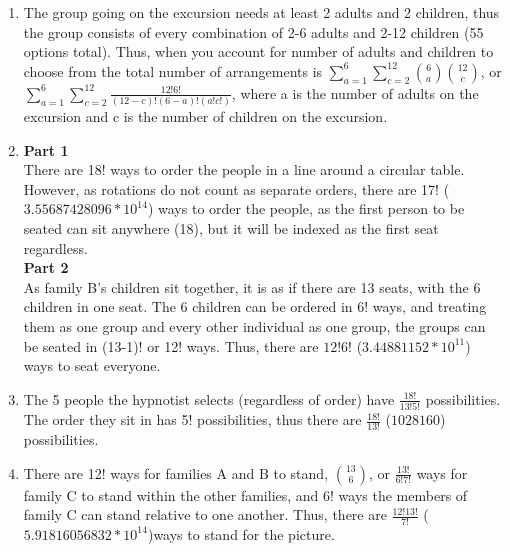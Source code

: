 \documentclass{article}
\theoremstyle{definition}
\begin{document}
\begin{enumerate}[label = \alph*)]
    \item
    The group going on the excursion needs at least 2 adults and 2 children, thus the group consists of every combination of 2-6 adults and 2-12 children (55 options total). Thus, when you account for number of adults and children to choose from the total number of arrangements is $\sum_{a=1}^6\sum_{c=2}^12\binom{6}{a}\binom{12}{c}$, or $\sum_{a=1}^6\sum_{c=2}^12 \frac{12!6!}{(12-c)!(6-a)!(a!c!)}$, where a is the number of adults on the excursion and c is the number of children on the excursion.
    
    \item
    \textbf{Part 1}\\
    There are 18! ways to order the people in a line around a circular table. However, as rotations do not count as separate orders, there are 17! ($3.55687428096*10^14$) ways to order the people, as the first person to be seated can sit anywhere (18), but it will be indexed as the first seat regardless.\\
    \textbf{Part 2}\\
    As family B's children sit together, it is as if there are 13 seats, with the 6 children in one seat. The 6 children can be ordered in 6! ways, and treating them as one group and every other individual as one group, the groups can be seated in (13-1)! or 12! ways. Thus, there are $12!6!$ ($3.44881152*10^11$) ways to seat everyone.

    \item
    The 5 people the hypnotist selects (regardless of order) have $\frac{18!}{13!5!}$ possibilities. The order they sit in has 5! possibilities, thus there are $\frac{18!}{13!}$ ($1028160$) possibilities.
    
    \item
    There are 12! ways for families A and B to stand, $\binom{13}{6}$, or $\frac{13!}{6!7!}$ ways for family C to stand within the other families, and 6! ways the members of family C can stand relative to one another. Thus, there are $\frac{12!13!}{7!}$ ($5.91816056832*10^14$)ways to stand for the picture.
    
    
\end{enumerate}
\end{document}
